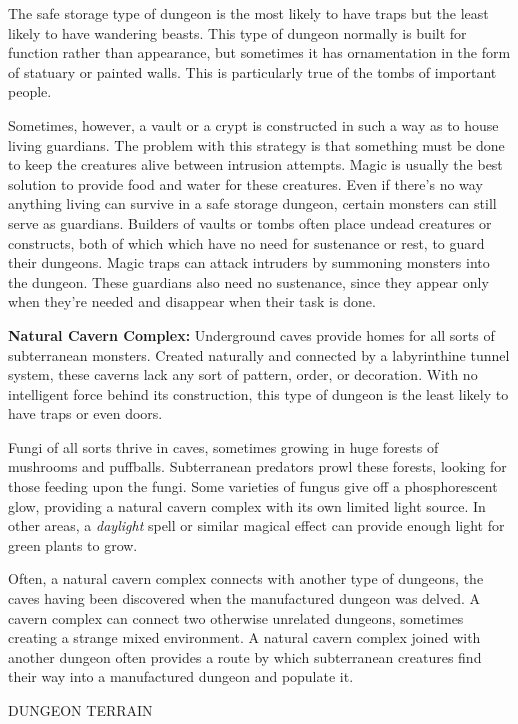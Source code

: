 \documentclass{article}
\begin{document}
The safe storage type of dungeon is the most likely to have traps but the least 
likely to have wandering beasts. This type of dungeon normally is built for function 
rather than appearance, but sometimes it has ornamentation in the form of statuary 
or painted walls. This is particularly true of the tombs of important people.

Sometimes, however, a vault or a crypt is constructed in such a way as to house 
living guardians. The problem with this strategy is that something must be done 
to keep the creatures alive between intrusion attempts. Magic is usually the best 
solution to provide food and water for these creatures. Even if there's no way 
anything living can survive in a safe storage dungeon, certain monsters can still 
serve as guardians. Builders of vaults or tombs often place undead creatures or 
constructs, both of which which have no need for sustenance or rest, to guard their 
dungeons. Magic traps can attack intruders by summoning monsters into the dungeon. 
These guardians also need no sustenance, since they appear only when they're needed 
and disappear when their task is done.

\textbf{Natural Cavern Complex:} Underground caves provide homes for all sorts 
of subterranean monsters. Created naturally and connected by a labyrinthine tunnel 
system, these caverns lack any sort of pattern, order, or decoration. With no intelligent 
force behind its construction, this type of dungeon is the least likely to have 
traps or even doors.

Fungi of all sorts thrive in caves, sometimes growing in huge forests of mushrooms 
and puffballs. Subterranean predators prowl these forests, looking for those feeding 
upon the fungi. Some varieties of fungus give off a phosphorescent glow, providing 
a natural cavern complex with its own limited light source. In other areas, a \textit{daylight 
}spell or similar magical effect can provide enough light for green plants to grow.

Often, a natural cavern complex connects with another type of dungeons, the caves 
having been discovered when the manufactured dungeon was delved. A cavern complex 
can connect two otherwise unrelated dungeons, sometimes creating a strange mixed 
environment. A natural cavern complex joined with another dungeon often provides 
a route by which subterranean creatures find their way into a manufactured dungeon 
and populate it.

\vspace{12pt}
{\LARGE{}DUNGEON TERRAIN}
\end{document}
